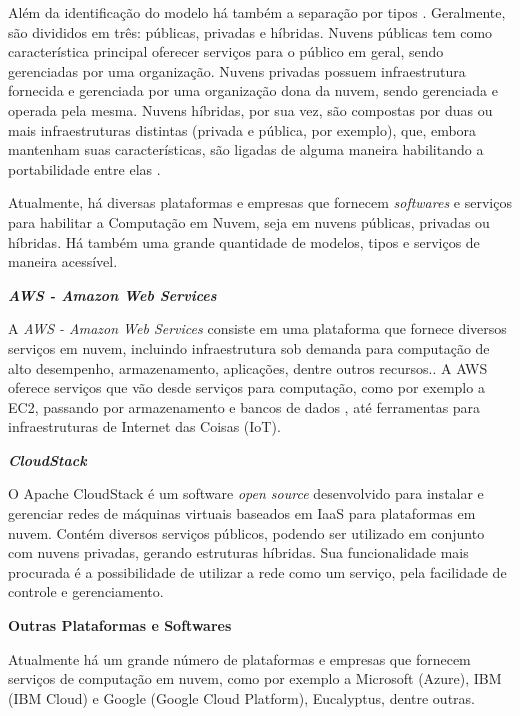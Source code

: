 Além da identificação do modelo há também a separação por tipos \cite{zhang2010cloud}. Geralmente, são divididos em três: públicas, privadas e híbridas. Nuvens públicas tem como característica principal oferecer serviços para o público em geral, sendo gerenciadas por uma organização. Nuvens privadas possuem infraestrutura fornecida e gerenciada por uma organização dona da nuvem, sendo gerenciada e operada pela mesma. Nuvens híbridas, por sua vez, são compostas por duas ou mais infraestruturas distintas (privada e pública, por exemplo), que, embora mantenham suas características, são ligadas de alguma maneira habilitando a portabilidade entre elas\cite{mell2011nist} \cite{zhang2010cloud} \cite{Bhaskar}.

Atualmente, há diversas plataformas e empresas que fornecem \textit{softwares} e serviços para habilitar a Computação em Nuvem, seja em nuvens públicas, privadas ou híbridas. Há também uma grande quantidade de modelos, tipos e serviços de maneira acessível. 
\newline

\textbf{\textit{{AWS - Amazon Web Services}}}

A \textit{{AWS - Amazon Web Services}} consiste em uma plataforma que fornece diversos serviços em nuvem, incluindo infraestrutura sob demanda para computação de alto desempenho, armazenamento, aplicações, dentre outros recursos.\cite{AmazonSolutions}. A AWS oferece serviços que vão desde serviços para computação, como por exemplo a EC2\cite{AmazonEC2}, passando por armazenamento e bancos de dados \cite{AmazonDB}, até ferramentas para infraestruturas de Internet das Coisas (IoT)\cite{AmazonIoT}. 
\newline

\textbf{\textit{{CloudStack}}}

O Apache CloudStack é um software \textit{open source} desenvolvido para instalar e gerenciar redes de máquinas virtuais baseados em IaaS para plataformas em nuvem. Contém diversos serviços públicos, podendo ser utilizado em conjunto com nuvens privadas, gerando estruturas híbridas. Sua funcionalidade mais procurada é a possibilidade de utilizar a rede como um serviço, pela facilidade de controle e gerenciamento. 
\newline

\textbf{Outras Plataformas e Softwares}

Atualmente há um grande número de plataformas e empresas que fornecem serviços de computação em nuvem, como por exemplo a Microsoft (Azure), IBM (IBM Cloud) e Google (Google Cloud Platform), Eucalyptus, dentre outras.


